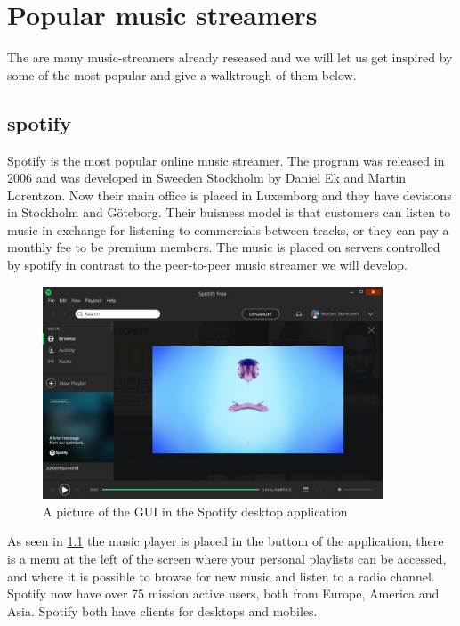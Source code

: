 \chapter{Popular music streamers}
The are many music-streamers already reseased and we will let us get inspired by some of the most popular and give a walktrough of them below.

\section{spotify}
Spotify is the most popular online music streamer. The program was released in 2006 and was developed in Sweeden Stockholm by Daniel Ek and Martin Lorentzon. Now their main office is placed in Luxemborg and they have devisions in Stockholm and Göteborg. Their buisness model is that customers can listen to music in exchange for listening to commercials between tracks, or they can pay a monthly fee to be premium members.
The music is placed on servers controlled by spotify in contrast to the peer-to-peer music streamer we will develop.
\begin{figure}[p]
  \centering
    \includegraphics[width=0.9\textwidth]{gfx/Spotify_desktop.jpg}
  \caption{A picture of the GUI in the Spotify desktop application}
  \label{fig:spotify}
\end{figure}
As seen in \ref{fig:spotify} the music player is placed in the buttom of the application, there is a menu at the left of the screen where your personal playlists can be accessed, and where it is possible to browse for new music and listen to a radio channel.
Spotify now have over 75 mission active users, both from Europe, America and Asia. Spotify both have clients for desktops and mobiles.

